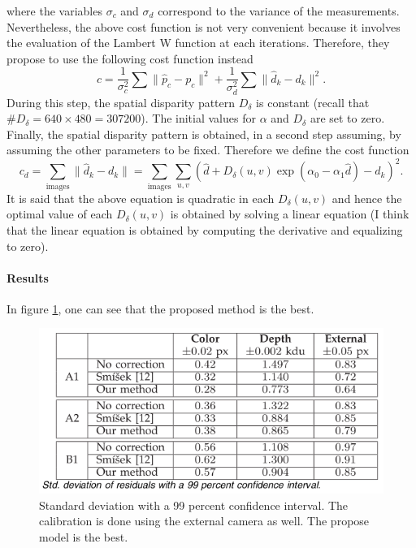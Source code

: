 \documentclass[11pt,a4paper]{article}
\begin{document}
where the variables $\sigma_c$ and $\sigma_d$ correspond to the variance of the measurements. Nevertheless, the above cost function is not very convenient because it involves the evaluation of the Lambert W function at each iterations. Therefore, they propose to use the following cost function instead
\begin{equation}
c = \frac{1}{\sigma_c^2}\sum \| \hat{p}_c-p_c \|^2 + \frac{1}{\sigma_d^2}\sum \| \hat{d}_k-d_k \|^2. 
\end{equation}
During this step, the spatial disparity pattern $D_{\delta}$ is constant (recall that $\#D_{\delta} = 640 \times 480 = 307200$). The initial values for $\alpha$ and $D_{\delta}$ are set to zero. Finally, the spatial disparity pattern is obtained, in a second step assuming, by assuming the other parameters to be fixed. Therefore we define the cost function\
\begin{equation}
c_d = \sum_{\text{images}} \| \hat{d}_k-d_k \| =  \sum_{\text{images}} \sum_{u,v} (\hat{d}+D_{\delta}(u,v) \exp (\alpha_0 - \alpha_1 \hat{d}) - d_k)^2.
\end{equation}
It is said that the above equation is quadratic in each $D_{\delta}(u,v)$ and hence the optimal value of each $D_{\delta}(u,v)$ is obtained by solving a linear equation (I think that the linear equation is obtained by computing the derivative and equalizing to zero).

\paragraph{Results} In figure \ref{Error_Herrera}, one can see that the proposed method is the best.

\begin{figure}[!h]
\centering
\includegraphics[scale=0.57]{Pictures/Error_Herrera}
\caption{Standard deviation with a 99 percent confidence interval. The calibration is done using the external camera as well. The propose model is the best. \label{Error_Herrera}}
\end{figure}
\end{document}
